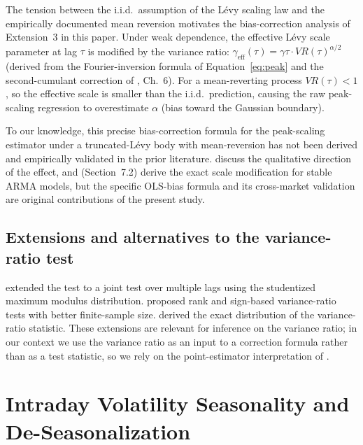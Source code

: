 \documentclass[12pt,a4paper]{article}
\begin{document}
The tension between the i.i.d.\ assumption of the Lévy scaling law and the
empirically documented mean reversion motivates the bias-correction analysis
of Extension~3 in this paper. Under weak dependence, the effective Lévy scale
parameter at lag $\tau$ is modified by the variance ratio:
$\gamma_{\mathrm{eff}}(\tau) = \gamma\tau \cdot VR(\tau)^{\alpha/2}$
(derived from the Fourier-inversion formula of Equation~\eqref{eq:peak} and
the second-cumulant correction of \textcite{BouchaudPotters2003}, Ch.~6).
For a mean-reverting process $VR(\tau) < 1$, so the effective scale is smaller
than the i.i.d.\ prediction, causing the raw peak-scaling regression to
overestimate $\alpha$ (bias toward the Gaussian boundary).

To our knowledge, this precise bias-correction formula for the peak-scaling
estimator under a truncated-Lévy body with mean-reversion has not been derived
and empirically validated in the prior literature. \textcite{BouchaudPotters2003}
discuss the qualitative direction of the effect, and
\textcite{SamorodTaqqu1994} (Section~7.2) derive the exact scale modification
for stable ARMA models, but the specific OLS-bias formula and its cross-market
validation are original contributions of the present study.

\subsection{Extensions and alternatives to the variance-ratio test}

\textcite{ChowDenning1993} extended the \textcite{LoMacKinlay1988} test to a
joint test over multiple lags using the studentized maximum modulus distribution.
\textcite{Wright2000} proposed rank and sign-based variance-ratio tests with
better finite-sample size. \textcite{Richardson1991} derived the exact
distribution of the variance-ratio statistic. These extensions are relevant for
inference on the variance ratio; in our context we use the variance ratio as an
input to a correction formula rather than as a test statistic, so we rely on
the point-estimator interpretation of \textcite{CampbellLoMacKinlay1997}.


\section{Intraday Volatility Seasonality and De-Seasonalization}
\label{sec:seasonality}
\end{document}
